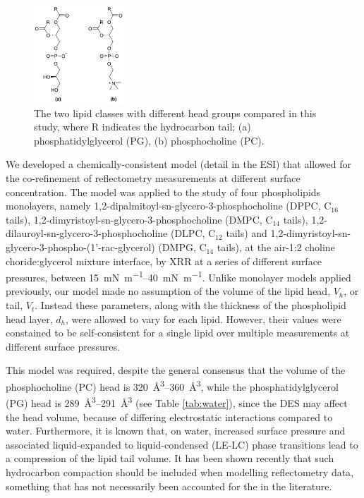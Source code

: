 \documentclass[twocolumn,a4paper]{paper}
\begin{document}
%
\begin{figure}
\centering
\includegraphics[width=0.3\textwidth]{figures/head_groups}
\caption{\label{fig:heads}\small The two lipid classes with different head groups compared in this study, where R indicates the hydrocarbon tail; (a) phosphatidylglycerol (PG), (b) phosphocholine (PC).}
\end{figure}
%
We developed a chemically-consistent model (detail in the ESI) that allowed for the co-refinement of reflectometry measurements at different surface concentration.
The model was applied to the study of four phospholipids monolayers, namely 1,2-dipalmitoyl-sn-glycero-3-phosphocholine (DPPC, C$_{16}$ tails), 1,2-dimyristoyl-sn-glycero-3-phosphocholine (DMPC, C$_{14}$ tails),  1,2-dilauroyl-sn-glycero-3-phosphocholine (DLPC, C$_{12}$ tails) and 1,2-dimyristoyl-sn-glycero-3-phospho-(1'-rac-glycerol) (DMPG, C$_{14}$ tails), at the air-1:2 choline choride:glycerol mixture interface, by XRR at a series of different surface pressures, between \SIrange{15}{40}{\milli\newton\per\meter}.
Unlike monolayer models applied previously\cite{Mohwald1990,Kewalramani2010,Bayerl1990,Johnson1991,Clifton2012,Helm1987,Daillant1990}, our model made no assumption of the volume of the lipid head, $V_h$, or tail, $V_t$.
Instead these parameters, along with the thickness of the phospholipid head layer, $d_h$, were allowed to vary for each lipid.
However, their values were constained to be self-consistent for a single lipid over multiple measurements at different surface pressures.

This model was required, despite the general consensus that the volume of the phosphocholine (PC) head is \SIrange{320}{360}{\cubic\angstrom}, while the phosphatidylglycerol (PG) head is \SIrange{289}{291}{\cubic\angstrom} (see Table \ref{tab:water}), since the DES may affect the head volume, because of differing electrostatic interactions compared to water.
Furthermore, it is known that, on water, increased surface pressure and associated liquid-expanded to liquid-condensed (LE-LC) phase transitions lead to a compression of the lipid tail volume\cite{Marsh2010,Small1984}.
It has been shown recently that such hydrocarbon compaction should be included when modelling reflectometry data\cite{Campbell2018}, something that has not necessarily been accounted for the in the literature.
\end{document}
